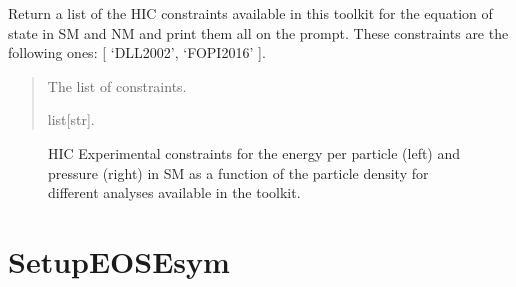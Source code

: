 \documentclass[letterpaper,10pt,english]{sphinxmanual}
\begin{document}

\begin{fulllineitems}
\label{\detokenize{source/api/setup_eos_hic:nucleardatapy.setup_eos_hic.eos_hic_constraints}}
\pysigstartsignatures
\pysiglinewithargsret
{}
{}
{}
\pysigstopsignatures
\sphinxAtStartPar
Return a list of the HIC constraints available in this toolkit
for the equation of state in SM and NM and print them all on
the prompt. These constraints are the following
ones: {[} ‘DLL\sphinxhyphen{}2002’, ‘FOPI\sphinxhyphen{}2016’ {]}.
\begin{quote}\begin{description}
\sphinxAtStartPar
The list of constraints.

\sphinxAtStartPar
list{[}str{]}.

\end{description}\end{quote}

\end{fulllineitems}


\begin{figure}[htbp]
\centering
\capstart

\noindent{}
\caption{HIC Experimental constraints for the energy per particle (left) and pressure (right) in SM as a function of the particle density for different analyses available in the  toolkit.}\label{\detokenize{source/api/setup_eos_hic:id1}}\end{figure}

\sphinxstepscope


\section{SetupEOSEsym}
\label{\detokenize{source/api/setup_eos_esym:setupeosesym}}\label{\detokenize{source/api/setup_eos_esym::doc}}\label{\detokenize{source/api/setup_eos_esym:module-nucleardatapy.setup_eos_esym}}
\end{document}
